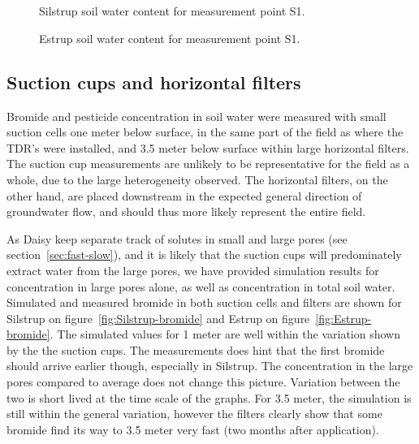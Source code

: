 \begin{figure}[htbp]
  \begin{center}
    \\
    \\
  \end{center}
  \caption{Silstrup soil water content for measurement point S1.}
  \label{fig:Silstrup-theta}
\end{figure}

\begin{figure}[htbp]
  \begin{center}
  \end{center}
  \caption{Estrup soil water content for measurement point S1.}
  \label{fig:Estrup-theta}
\end{figure}

\FloatBarrier
\subsection{Suction cups and horizontal filters}

Bromide and pesticide concentration in soil water were measured with
small suction cells one meter below surface, in the same part of the
field as where the TDR's were installed, and 3.5 meter below surface
within large horizontal filters.  The suction cup measurements are
unlikely to be representative for the field as a whole, due to the
large heterogeneity observed.  The horizontal filters, on the other
hand, are placed downstream in the expected general direction of
groundwater flow, and should thus more likely represent the entire
field.

As Daisy keep separate track of solutes in small and large pores (see
section~\ref{sec:fast-slow}), and it is likely that the suction cups
will predominately extract water from the large pores, we have
provided simulation results for concentration in large pores alone, as
well as concentration in total soil water.  Simulated and measured
bromide in both suction cells and filters are shown for Silstrup on
figure~\ref{fig:Silstrup-bromide} and Estrup on
figure~\ref{fig:Estrup-bromide}.  The simulated values for 1 meter are
well within the variation shown by the the suction cups.  The
measurements does hint that the first bromide should arrive earlier
though, especially in Silstrup.  The concentration in the large pores
compared to average does not change this picture.  Variation between
the two is short lived at the time scale of the graphs.  For 3.5
meter, the simulation is still within the general variation, however
the filters clearly show that some bromide find its way to 3.5 meter
very fast (two months after application).

